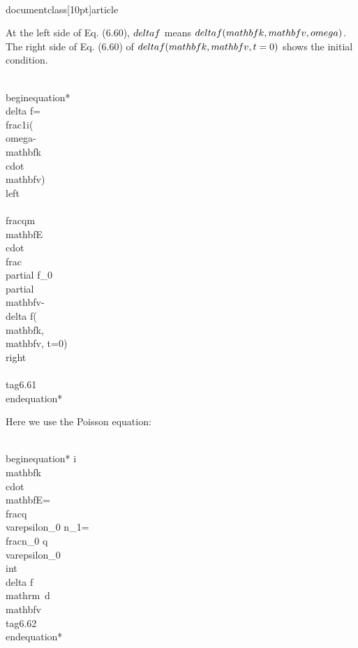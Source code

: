 \\documentclass[10pt]{article}
\begin{document}
{{{{At the left side of Eq. (6.60), $\\delta f$ means $\\delta f(\\mathbf{k}, \\mathbf{v}, \\omega)$. The right side of Eq. (6.60) of $\\delta f(\\mathbf{k}, \\mathbf{v}, t=0)$ shows the initial condition.


\\begin{equation*}
\\delta f=\\frac{1}{i(\\omega-\\mathbf{k} \\cdot \\mathbf{v})}\\left\\{\\frac{q}{m} \\mathbf{E} \\cdot \\frac{\\partial f_{0}}{\\partial \\mathbf{v}}-\\delta f(\\mathbf{k}, \\mathbf{v}, t=0)\\right\\} \\tag{6.61}
\\end{equation*}


Here we use the Poisson equation:


\\begin{equation*}
i \\mathbf{k} \\cdot \\mathbf{E}=\\frac{q}{\\varepsilon_{0}} n_{1}=\\frac{n_{0} q}{\\varepsilon_{0}} \\int \\delta f \\mathrm{~d} \\mathbf{v} \\tag{6.62}
\\end{equation*}


}}}}
\end{document}
